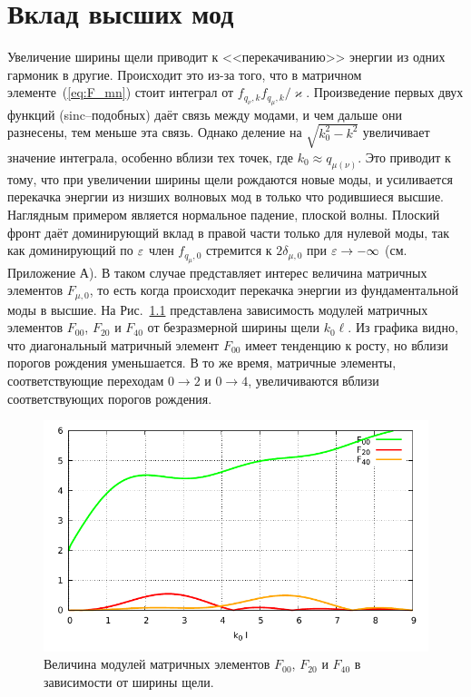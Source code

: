 \chapter{Вклад высших мод}
Увеличение ширины щели приводит к <<перекачиванию>> энергии из одних гармоник в другие. Происходит это из-за того, что в матричном элементе~(\ref{eq:F_mn}) стоит интеграл от $f_{q_\nu,k}f_{q_\mu,k}/\varkappa$. Произведение первых двух функций (sinc--подобных) даёт связь между модами, и чем дальше они разнесены, тем меньше эта связь. Однако деление на $\sqrt{k_0^2-k^2}$ увеличивает значение интеграла, особенно вблизи тех точек, где $k_0 \approx q_{\mu (\nu)}$. Это приводит к тому, что при увеличении ширины щели рождаются новые моды, и усиливается перекачка энергии из низших волновых мод в только что родившиеся высшие. Наглядным примером является нормальное падение, плоской волны. Плоский фронт даёт доминирующий вклад в правой части только для нулевой моды, так как доминирующий по $\varepsilon$ член $f_{q_\mu,0}$ стремится к $2\delta_{\mu,0}$ при $\varepsilon \to -\infty$ (см. Приложение А). В таком случае
представляет интерес величина матричных элементов $F_{\mu,0}$, то есть когда происходит перекачка энергии из фундаментальной моды в высшие.
На Рис.~\ref{fig:mat_el_00} представлена зависимость модулей матричных элементов $F_{00}$, $F_{20}$ и $F_{40}$ от безразмерной ширины щели $k_0 \ell$. Из графика видно, что диагональный матричный элемент $F_{00}$ имеет тенденцию к росту, но вблизи порогов рождения уменьшается. В то же время, матричные элементы, соответствующие переходам $0\to 2$ и $0\to 4$, увеличиваются вблизи соответствующих порогов рождения.

\begin{figure}
    \centering
    \includegraphics[width = \textwidth]{figures/F00.pdf}
    \caption{Величина модулей матричных элементов $F_{00}$, $F_{20}$ и $F_{40}$ в зависимости от ширины щели.}
    \label{fig:mat_el_00}
\end{figure}

